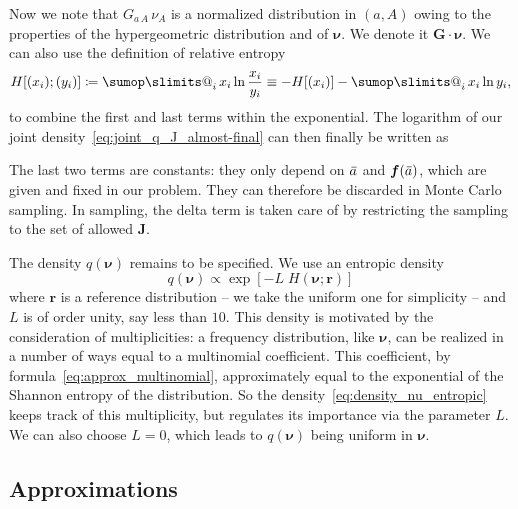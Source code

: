 \documentclass[\ifafour a4paper,12pt,\else a5paper,10pt,\fi%
onecolumn,oneside,article,%
british%
]{memoir}
\makeatletter
\newcommand*{\widefbox}[1]{\fbox{\hspace{1em}#1\hspace{1em}}}
\theoremstyle{remark}
\theoremstyle{innote}
\def\sum{\DOTSI\sumop\slimits@}
\newcommand*{\delt}{\deltaup}%
\newcommand*{\defd}{\coloneqq}
\newcommand*{\pf}{\mathrm{p}}%
\renewcommand*{\|}[1][]{\nonscript\,#1\vert\nonscript\;\mathopen{}}
\newcommand*{\tsum}{\mathop{\textstyle\sum}\nolimits}
\newcommand*{\widebar}[1]{{\mkern1.5mu\skew{2}\overline{\mkern-1.5mu#1\mkern-1.5mu}\mkern 1.5mu}}
\newcommand*{\yG}{\bm{G}}
\newcommand*{\yff}{f}
\newcommand*{\yf}{\bm{\yff}}
\newcommand*{\yas}{\widebar{a}}%
\newcommand*{\yI}{\varIota}
\newcommand*{\ysh}{H}
\newcommand*{\yJJ}{J}
\newcommand*{\yJ}{\bm{\yJJ}}
\newcommand*{\yr}{\bm{r}}
\newcommand*{\ynuu}{\nu}
\newcommand*{\ynu}{\bm{\ynuu}}
\newcommand*{\yeq}{\mathrel{\!=\!}}
\makeatother
\begin{document}
Now we note that $G_{a\,A}\,\nu_{A}$ is a normalized distribution in
$(a,A)$ owing to the properties of the hypergeometric distribution and of
$\ynu$. We denote it $\yG\cdot\ynu$. We can also use the definition of
relative entropy
\begin{equation}
  \label{eq:rel_entropy}
  \ysh[(x_{i}); (y_{i})] \defd \tsum_{i} x_{i} \ln\frac{x_{i}}{y_{i}}
\equiv -\ysh[(x_{i})] -\tsum_{i} x_{i} \ln y_{i},
\end{equation}
to combine the first and last terms within the exponential. The logarithm
of our joint density~\eqref{eq:joint_q_J_almost-final} can then finally be
written as

The last two terms are constants: they only depend on $\yas$ and
$\yf(\yas)$, which are given and fixed in our problem. They can therefore
be discarded in Monte Carlo sampling. In sampling, the delta term is taken
care of by restricting the sampling to the set of allowed $\yJ$.

\medskip

The density $q(\ynu)$ remains to be specified. We use an entropic density
\begin{equation}
  \label{eq:density_nu_entropic}
  q(\ynu) \propto \exp[-L\;\ysh(\ynu;\yr)]
\end{equation}
where $\yr$ is a reference distribution -- we take the uniform one for
simplicity -- and $L$ is of order unity, say less than $10$. This density
is motivated by the consideration of multiplicities: a frequency
distribution, like $\ynu$, can be realized in a number of ways equal to a
multinomial coefficient. This coefficient, by
formula~\eqref{eq:approx_multinomial}, approximately equal to the
exponential of the Shannon entropy of the distribution. So the
density~\eqref{eq:density_nu_entropic} keeps track of this multiplicity,
but regulates its importance via the parameter $L$. We can also choose
$L=0$, which leads to $q(\ynu)$ being uniform in $\ynu$.

\subsection{Approximations}
\label{sec:approx_final}
\end{document}
